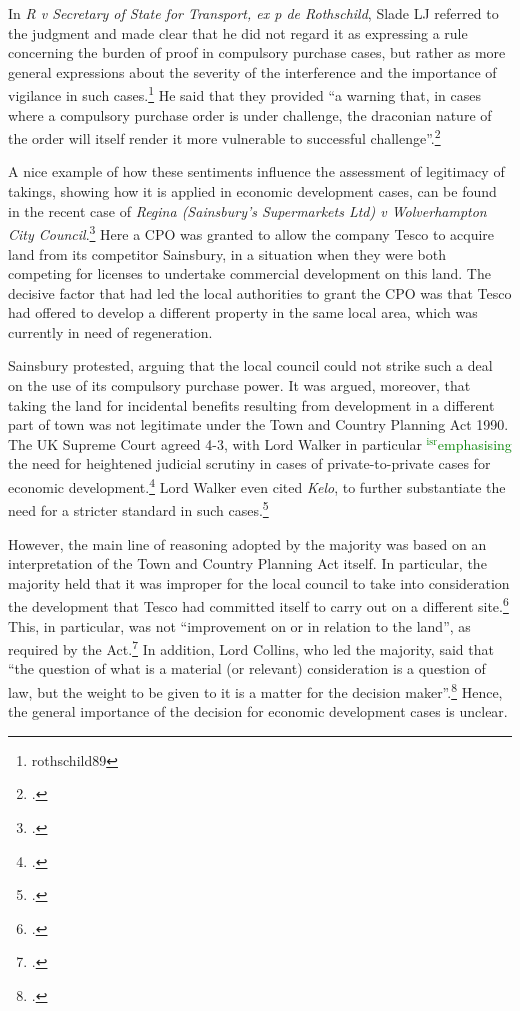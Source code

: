 \documentclass[12pt,a4paper]{book} %
\newcommand{\isr}[1]{\textcolor{green}{$^{\textrm{isr}}${#1}}}
\begin{document}
In {\it R v Secretary of State for Transport, ex p de Rothschild}, Slade LJ referred to the judgment and made clear that he did not regard it as expressing a rule concerning the burden of proof in compulsory purchase cases, but rather as more general expressions about the severity of the interference and the importance of vigilance in such cases.\footnote{rothschild89} He said that they provided ``a warning that, in cases where a compulsory purchase order is under challenge, the draconian nature of the order will itself render it more vulnerable to successful challenge''.\footcite[938]{rothschild89}

A nice example of how these sentiments influence the assessment of legitimacy of takings, showing how it is applied in economic development cases, can be found in the recent case of {\it Regina (Sainsbury’s Supermarkets Ltd) v Wolverhampton City Council}.\footcite{sainsbury10} Here a CPO was granted to allow the company Tesco to acquire land from its competitor Sainsbury, in a situation when they were both competing for licenses to undertake commercial development on this land. The decisive factor that had led the local authorities to grant the CPO was that Tesco had offered to develop a different property in the same local area, which was currently in need of regeneration. 

Sainsbury protested, arguing that the local council could not strike such a deal on the use of its compulsory purchase power. It was argued, moreover, that taking the land for incidental benefits resulting from development in a different part of town was not legitimate under the Town and Country Planning Act 1990. The UK Supreme Court agreed 4-3, with Lord Walker in particular \isr{emphasising} the need for heightened judicial scrutiny in cases of private-to-private cases for economic development.\footcite[80-84]{sainsbury10} Lord Walker even cited {\it Kelo}, to further substantiate the need for a stricter standard in such cases.\footcite[81]{sainsbury10} 

However, the main line of reasoning adopted by the majority was based on an interpretation of the Town and Country Planning Act itself. In particular, the majority held that it was improper for the local council to take into consideration the development that Tesco had committed itself to carry out on a different site.\footcite[73-79]{sainsbury10} This, in particular, was not ``improvement on or in relation to the land'', as required by the Act.\footcite[336]{tcpa90} In addition, Lord Collins, who led the majority, said that ``the question of what is a material (or relevant) consideration is a question of law, but the weight to be given to it is a matter for the decision maker''.\footcite[70]{sainsbury10} Hence, the general importance of the decision for economic development cases is unclear.
\end{document}

